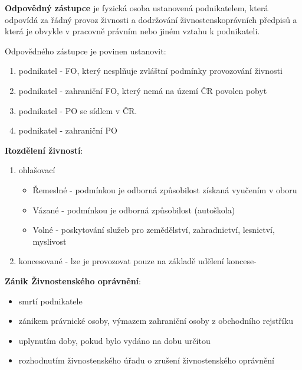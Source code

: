 \documentclass[11pt,a4paper,twoside]{book}
\begin{document}
	\textbf{Odpovědný zástupce} je fyzická osoba ustanovená podnikatelem, která odpovídá za řádný provoz živnosti a dodržování živnostenskoprávních předpisů a která je obvykle v pracovně právním nebo jiném vztahu k podnikateli.

	Odpovědného zástupce je povinen ustanovit:
	\begin{enumerate}
		\item podnikatel - FO, který nesplňuje zvláštní podmínky provozování živnosti
		\item podnikatel - zahraniční FO, který nemá na území ČR povolen pobyt
		\item podnikatel - PO se sídlem v ČR.
		\item podnikatel - zahraniční PO
	\end{enumerate}

	\textbf{Rozdělení živností}:
	\begin{enumerate}
		\item ohlašovací
			\begin{itemize}
				\item Řemeslné - podmínkou je odborná způsobilost získaná vyučením v oboru
				\item Vázané - podmínkou je odborná způsobilost (autoškola)
				\item Volné - poskytování služeb pro zemědělství, zahradnictví, lesnictví, myslivost
			\end{itemize}				
		\item koncesované - lze je provozovat pouze na základě udělení koncese-
	\end{enumerate}	

	\textbf{Zánik Živnostenského oprávnění}:
	\begin{itemize}
		\item smrtí podnikatele
		\item zánikem právnické osoby, výmazem zahraniční osoby z obchodního rejstříku
		\item uplynutím doby, pokud bylo vydáno na dobu určitou
		\item rozhodnutím živnostenského úřadu o zrušení živnostenského oprávnění
	\end{itemize}
\end{document}
